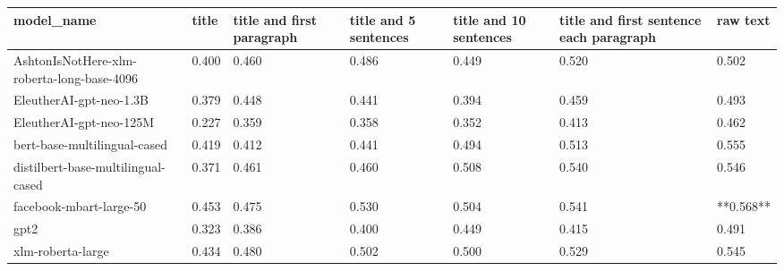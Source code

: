 \begin{tabular}{lllllll}
\toprule
                                model\_name & title & title and first paragraph & title and 5 sentences & title and 10 sentences & title and first sentence each paragraph &  raw text \\
\midrule
AshtonIsNotHere-xlm-roberta-long-base-4096 & 0.400 &                     0.460 &                 0.486 &                  0.449 &                                   0.520 &     0.502 \\
                   EleutherAI-gpt-neo-1.3B & 0.379 &                     0.448 &                 0.441 &                  0.394 &                                   0.459 &     0.493 \\
                   EleutherAI-gpt-neo-125M & 0.227 &                     0.359 &                 0.358 &                  0.352 &                                   0.413 &     0.462 \\
              bert-base-multilingual-cased & 0.419 &                     0.412 &                 0.441 &                  0.494 &                                   0.513 &     0.555 \\
        distilbert-base-multilingual-cased & 0.371 &                     0.461 &                 0.460 &                  0.508 &                                   0.540 &     0.546 \\
                   facebook-mbart-large-50 & 0.453 &                     0.475 &                 0.530 &                  0.504 &                                   0.541 & **0.568** \\
                                      gpt2 & 0.323 &                     0.386 &                 0.400 &                  0.449 &                                   0.415 &     0.491 \\
                         xlm-roberta-large & 0.434 &                     0.480 &                 0.502 &                  0.500 &                                   0.529 &     0.545 \\
\bottomrule
\end{tabular}
